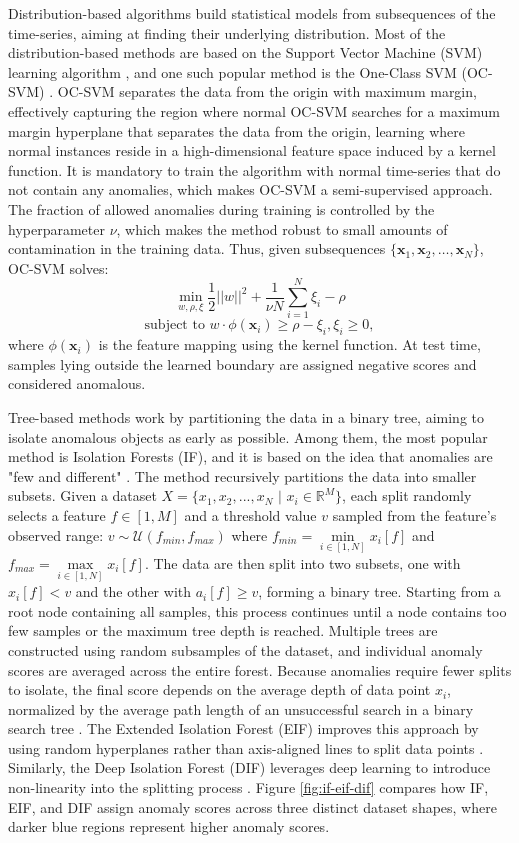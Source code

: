 Distribution-based algorithms build statistical models from subsequences of the time-series, aiming at finding their underlying distribution. Most of the distribution-based methods are based on the Support Vector Machine (SVM) learning algorithm \cite{boniol2024ts-ad-review}, and one such popular method is the One-Class SVM (OC-SVM) \cite{scholkopf1999oc-svm}. OC-SVM separates the data from the origin with maximum margin, effectively capturing the region where normal
OC-SVM searches for a maximum margin hyperplane that separates the data from the origin, learning where normal instances reside in a high-dimensional feature space induced by a kernel function. It is mandatory to train the algorithm with normal time-series that do not contain any anomalies, which makes OC-SVM a semi-supervised approach. The fraction of allowed anomalies during training is controlled by the hyperparameter $\nu$, which makes the method robust to small amounts of contamination in the training data. Thus, given subsequences $\{ \textbf{x}_1, \textbf{x}_2, \dots, \textbf{x}_N \}$, OC-SVM solves:
$$
\min_{w, \rho, \xi} \frac{1}{2} ||w||^2 + \frac{1}{\nu N} \sum_{i=1}^N \xi_i-\rho
$$
$$
\text{subject to } w \cdot \phi(\textbf{x}_i) \geq\rho - \xi_i, \xi_i \geq 0,
$$
where $\phi(\textbf{x}_i)$ is the feature mapping using the kernel function. At test time, samples lying outside the learned boundary are assigned negative scores and considered anomalous.

Tree-based methods work by partitioning the data in a binary tree, aiming to isolate anomalous objects as early as possible. Among them, the most popular method is Isolation Forests (IF), and it is based on the idea that anomalies are "few and different" \cite{liu2008iforest}. The method recursively partitions the data into smaller subsets. Given a dataset $X = \{x_1, x_2, ..., x_N \text{ | } x_i \in \mathbb{R}^M\}$, each split randomly selects a feature $f \in [1,M]$ and a threshold value $v$ sampled from the feature’s observed range: $v \sim \mathcal{U}(f_{min}, f_{max})$ where $f_{min} = \min\limits_{i \in [1,N]} x_i[f]$ and $f_{max} = \max\limits_{i \in [1,N]} x_i[f]$. The data are then split into two subsets, one with $x_i[f] < v$ and the other with $a_i[f] \geq v$, forming a binary tree. Starting from a root node containing all samples, this process continues until a node contains too few samples or the maximum tree depth is reached. Multiple trees are constructed using random subsamples of the dataset, and individual anomaly scores are averaged across the entire forest. Because anomalies require fewer splits to isolate, the final score depends on the average depth of data point $x_i$, normalized by the average path length of an unsuccessful search in a binary search tree \cite{liu2008iforest}. The Extended Isolation Forest (EIF) improves this approach by using random hyperplanes rather than axis-aligned lines to split data points \cite{hariri2019eiforest}. Similarly, the Deep Isolation Forest (DIF) leverages deep learning to introduce non-linearity into the splitting process \cite{xu2023diforest}. Figure \ref{fig:if-eif-dif} compares how IF, EIF, and DIF assign anomaly scores across three distinct dataset shapes, where darker blue regions represent higher anomaly scores.

